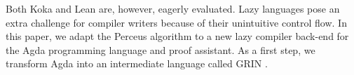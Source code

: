 \documentclass[10pt, twocolumn]{article}
\begin{document}
Both Koka and Lean are, however, eagerly evaluated. 
Lazy languages pose an extra challenge for compiler writers because of their unintuitive control flow. 
In this paper, we adapt the Perceus algorithm to a new lazy compiler back-end for the Agda programming language and proof assistant.
As a first step, we transform Agda into an intermediate language called GRIN \citep{johnsson1991}.


\end{document}
